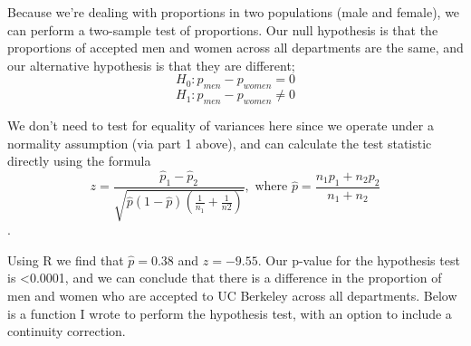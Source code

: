 \documentclass[]{article}
\begin{document}
Because we're dealing with proportions in two populations (male and
female), we can perform a two-sample test of proportions. Our null
hypothesis is that the proportions of accepted men and women across all
departments are the same, and our alternative hypothesis is that they
are different; \[H_0: p_{men} - p_{women} = 0\]
\[H_1: p_{men} - p_{women} \neq 0\]

We don't need to test for equality of variances here since we operate
under a normality assumption (via part 1 above), and can calculate the
test statistic directly using the formula
\[z = \frac{\hat{p}_1 - \hat{p}_2}{\sqrt{\hat{p}(1-\hat{p})(\frac{1}{n_1} + \frac{1}{n2})}}, \text{ where } \hat{p} = \frac{n_1p_1 + n_2p_2}{n_1 + n_2}\].

Using R we find that \(\hat{p} = 0.38\) and \(z = -9.55\). Our p-value
for the hypothesis test is \textless{}0.0001, and we can conclude that
there is a difference in the proportion of men and women who are
accepted to UC Berkeley across all departments. Below is a function I
wrote to perform the hypothesis test, with an option to include a
continuity correction.
\end{document}
